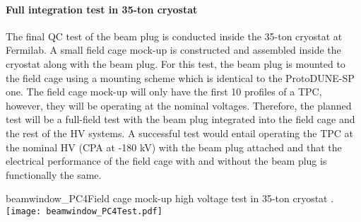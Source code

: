 \paragraph{Full integration test in 35-ton cryostat}
The final QC test of the beam plug is conducted inside the 35-ton cryostat at Fermilab. A small field cage mock-up is constructed and assembled inside the cryostat along with the beam plug. For this test, the beam plug is mounted to the field cage using a mounting scheme which is identical to the ProtoDUNE-SP one. The field cage mock-up will only have the first 10 profiles of a TPC, however, they will be operating at the nominal voltages. Therefore, the planned test will be a full-field test with the beam plug integrated into the field cage and the rest of the HV systems. A successful test would entail operating the TPC at the nominal HV (CPA at -180 kV) with the beam plug attached and that the electrical performance of the field cage with and without the beam plug is functionally the same.

\begin{cdrfigure}{beamwindow_PC4}{Field cage mock-up high voltage test in 35-ton cryostat .}
  \texttt{[image: beamwindow\_PC4Test.pdf]}
\end{cdrfigure}



